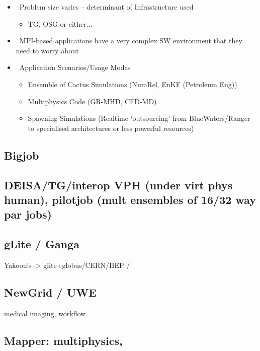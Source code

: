\documentclass[3p,twocolumn]{article}
\begin{document}
 \begin{itemize}

  \item  Problem size varies – determinant of Infrastructure used
         \begin{itemize}
          \item TG, OSG or either...
         \end{itemize}

  \item  MPI-based applications have a very complex SW
         environment that they need to worry about

  \item  Application Scenarios/Usage Modes
         \begin{itemize}
          \item Ensemble of Cactus Simulations
                (NumRel, EnKF (Petroleum Eng))
          \item Multiphysics Code
                (GR-MHD, CFD-MD)
          \item Spawning Simulations
                (Realtime ‘outsourcing’ from BlueWaters/Ranger to 
                 specialised architectures or less powerful resources)
         \end{itemize}

  \end{itemize}

 \subsection{Bigjob}

 \subsection{DEISA/TG/interop VPH (under virt phys human), pilotjob
 (mult ensembles of 16/32 way par jobs)}

 \subsection{gLite / Ganga}

  Yakooub -> glite+globus/CERN/HEP /


 \subsection{NewGrid / UWE}

  medical imaging, workflow


 \subsection{Mapper: multiphysics,}
\end{document}

